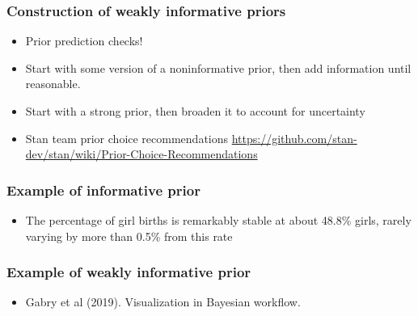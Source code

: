 \documentclass[10pt]{beamer}
\begin{document}
\begin{frame}
\frametitle{Construction of weakly informative priors}

  \begin{itemize}
      \item Prior prediction checks!
      \item Start with some version of a noninformative prior, then add  information until reasonable.
      \item Start with a strong prior, then broaden it to account for uncertainty
      \pause
    \item Stan team prior choice recommendations \url{https://github.com/stan-dev/stan/wiki/Prior-Choice-Recommendations}
  \end{itemize}

\end{frame}

\begin{frame}

  \frametitle{Example of informative prior}

  \begin{itemize}
  \item The percentage of girl births is remarkably stable at about
    48.8\% girls, rarely varying by more than 0.5\% from this rate
  \end{itemize}
  \begin{center}
  \end{center}
\end{frame}

\begin{frame}
\frametitle{Example of weakly informative prior}

  \begin{itemize}
  \item Gabry et al (2019). Visualization in Bayesian workflow.
  \end{itemize}
  \begin{center}
  \end{center}
\end{frame}
\end{document}
